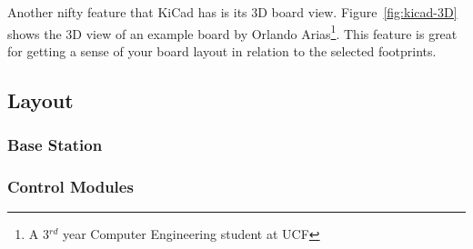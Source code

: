 Another nifty feature that KiCad has is its 3D board view. Figure~\ref{fig:kicad-3D} shows the 3D view of an example board by Orlando Arias\footnote{A 3$^{rd}$ year Computer Engineering student at UCF}. This feature is great for getting a sense of your board layout in relation to the selected footprints.


\subsection{Layout}

\subsubsection{Base Station}

\subsubsection{Control Modules}

